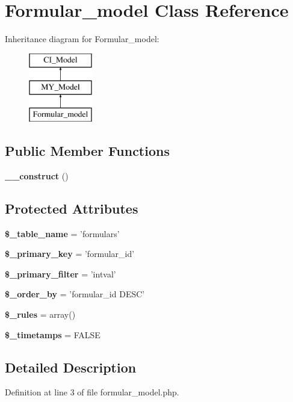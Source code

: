 \section{Formular\-\_\-model Class Reference}
\label{class_formular__model}
Inheritance diagram for Formular\-\_\-model\-:\begin{figure}[H]
\begin{center}
\leavevmode
\includegraphics[height=3.000000cm]{class_formular__model}
\end{center}
\end{figure}
\subsection*{Public Member Functions}
\begin{DoxyCompactItemize}
\item 
{\bf \-\_\-\-\_\-construct} ()
\end{DoxyCompactItemize}
\subsection*{Protected Attributes}
\begin{DoxyCompactItemize}
\item 
{\bf \$\-\_\-table\-\_\-name} = 'formulars'
\item 
{\bf \$\-\_\-primary\-\_\-key} = 'formular\-\_\-id'
\item 
{\bf \$\-\_\-primary\-\_\-filter} = 'intval'
\item 
{\bf \$\-\_\-order\-\_\-by} = 'formular\-\_\-id D\-E\-S\-C'
\item 
{\bf \$\-\_\-rules} = array()
\item 
{\bf \$\-\_\-timetamps} = F\-A\-L\-S\-E
\end{DoxyCompactItemize}


\subsection{Detailed Description}


Definition at line 3 of file formular\-\_\-model.\-php.



